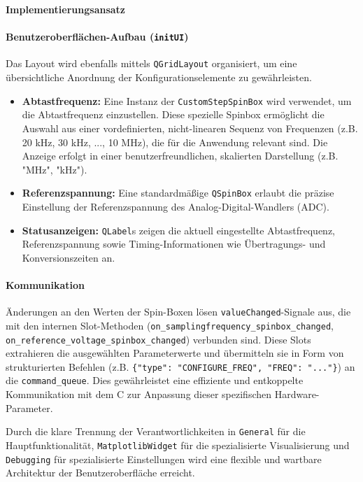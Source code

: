 \documentclass[a4paper, portrait, 12pt]{scrartcl} %
\begin{document}
\textbf{Implementierungsansatz}
\paragraph{Benutzeroberflächen-Aufbau (\texttt{initUI})}
Das Layout wird ebenfalls mittels \texttt{QGridLayout} organisiert, um eine übersichtliche Anordnung der Konfigurationselemente zu gewährleisten.
\begin{itemize}
    \item \textbf{Abtastfrequenz:} Eine Instanz der \texttt{CustomStepSpinBox} wird verwendet, um die Abtastfrequenz einzustellen. Diese spezielle Spinbox ermöglicht die Auswahl aus einer vordefinierten, nicht-linearen Sequenz von Frequenzen (z.B. 20 kHz, 30 kHz, ..., 10 MHz), die für die Anwendung relevant sind. Die Anzeige erfolgt in einer benutzerfreundlichen, skalierten Darstellung (z.B. "MHz", "kHz").
    \item \textbf{Referenzspannung:} Eine standardmäßige \texttt{QSpinBox} erlaubt die präzise Einstellung der Referenzspannung des Analog-Digital-Wandlers (ADC).
    \item \textbf{Statusanzeigen:} \texttt{QLabel}s zeigen die aktuell eingestellte Abtastfrequenz, Referenzspannung sowie Timing-Informationen wie Übertragungs- und Konversionszeiten an.
\end{itemize}

\paragraph{Kommunikation}
Änderungen an den Werten der Spin-Boxen lösen \texttt{valueChanged}-Signale aus, die mit den internen Slot-Methoden (\texttt{on\_samplingfrequency\_spinbox\_changed}, \texttt{on\_reference\_voltage\_spinbox\_changed}) verbunden sind. Diese Slots extrahieren die ausgewählten Parameterwerte und übermitteln sie in Form von strukturierten Befehlen (z.B. \texttt{\{"type": "CONFIGURE\_FREQ", "FREQ": "..."\}}) an die \texttt{command\_queue}. Dies gewährleistet eine effiziente und entkoppelte Kommunikation mit dem \textmu C zur Anpassung dieser spezifischen Hardware-Parameter.

Durch die klare Trennung der Verantwortlichkeiten in \texttt{General} für die Hauptfunktionalität, \texttt{MatplotlibWidget} für die spezialisierte Visualisierung und \texttt{Debugging} für spezialisierte Einstellungen wird eine flexible und wartbare Architektur der Benutzeroberfläche erreicht.
\end{document}
